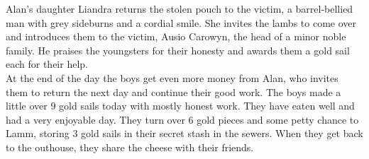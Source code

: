 Alan's daughter Liandra returns the stolen pouch to the victim, a barrel-bellied man with grey sideburns and a cordial smile. She invites the lambs to come over and introduces them to the victim, Ausio Carowyn, the head of a minor noble family. He praises the youngsters for their honesty and awards them a gold sail each for their help.\\

At the end of the day the boys get even more money from Alan, who invites them to return the next day and continue their good work. The boys made a little over 9 gold sails today with mostly honest work. They have eaten well and had a very enjoyable day. They turn over 6 gold pieces and some petty chance to Lamm, storing 3 gold sails in their secret stash in the sewers. When they get back to the outhouse, they share the cheese with their friends.\\

